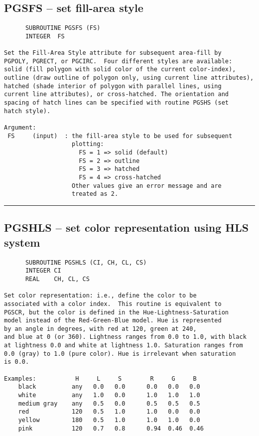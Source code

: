 {\subsection*{PGSFS -- set fill-area style }
\begin{verbatim}
      SUBROUTINE PGSFS (FS)
      INTEGER  FS

Set the Fill-Area Style attribute for subsequent area-fill by
PGPOLY, PGRECT, or PGCIRC.  Four different styles are available: 
solid (fill polygon with solid color of the current color-index), 
outline (draw outline of polygon only, using current line attributes),
hatched (shade interior of polygon with parallel lines, using
current line attributes), or cross-hatched. The orientation and
spacing of hatch lines can be specified with routine PGSHS (set
hatch style).

Argument:
 FS     (input)  : the fill-area style to be used for subsequent
                   plotting:
                     FS = 1 => solid (default)
                     FS = 2 => outline
                     FS = 3 => hatched
                     FS = 4 => cross-hatched
                   Other values give an error message and are
                   treated as 2.
\end{verbatim}
\hrule


\subsection*{PGSHLS -- set color representation using HLS system }
\begin{verbatim}
      SUBROUTINE PGSHLS (CI, CH, CL, CS)
      INTEGER CI
      REAL    CH, CL, CS

Set color representation: i.e., define the color to be
associated with a color index.  This routine is equivalent to
PGSCR, but the color is defined in the Hue-Lightness-Saturation
model instead of the Red-Green-Blue model. Hue is represented
by an angle in degrees, with red at 120, green at 240,
and blue at 0 (or 360). Lightness ranges from 0.0 to 1.0, with black
at lightness 0.0 and white at lightness 1.0. Saturation ranges from
0.0 (gray) to 1.0 (pure color). Hue is irrelevant when saturation
is 0.0.

Examples:           H     L     S        R     G     B
    black          any   0.0   0.0      0.0   0.0   0.0
    white          any   1.0   0.0      1.0   1.0   1.0
    medium gray    any   0.5   0.0      0.5   0.5   0.5
    red            120   0.5   1.0      1.0   0.0   0.0
    yellow         180   0.5   1.0      1.0   1.0   0.0
    pink           120   0.7   0.8      0.94  0.46  0.46


\end{verbatim}}
